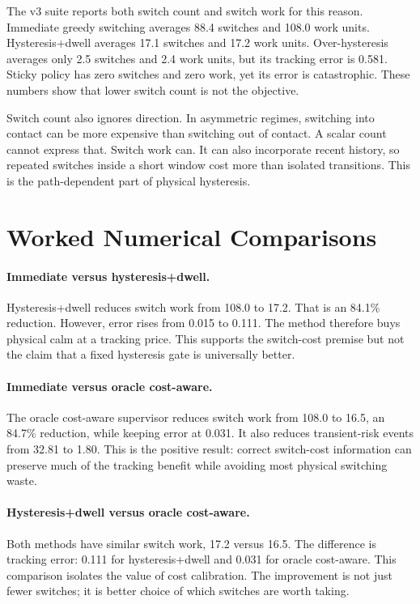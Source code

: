 \documentclass{article}
\begin{document}
The v3 suite reports both switch count and switch work for this reason.
Immediate greedy switching averages 88.4 switches and 108.0 work units.
Hysteresis+dwell averages 17.1 switches and 17.2 work units.
Over-hysteresis averages only 2.5 switches and 2.4 work units, but its tracking error is 0.581.
Sticky policy has zero switches and zero work, yet its error is catastrophic.
These numbers show that lower switch count is not the objective.

Switch count also ignores direction.
In asymmetric regimes, switching into contact can be more expensive than switching out of contact.
A scalar count cannot express that.
Switch work can.
It can also incorporate recent history, so repeated switches inside a short window cost more than isolated transitions.
This is the path-dependent part of physical hysteresis.

\section{Worked Numerical Comparisons}

\paragraph{Immediate versus hysteresis+dwell.}
Hysteresis+dwell reduces switch work from 108.0 to 17.2.
That is an 84.1\% reduction.
However, error rises from 0.015 to 0.111.
The method therefore buys physical calm at a tracking price.
This supports the switch-cost premise but not the claim that a fixed hysteresis gate is universally better.

\paragraph{Immediate versus oracle cost-aware.}
The oracle cost-aware supervisor reduces switch work from 108.0 to 16.5, an 84.7\% reduction, while keeping error at 0.031.
It also reduces transient-risk events from 32.81 to 1.80.
This is the positive result: correct switch-cost information can preserve much of the tracking benefit while avoiding most physical switching waste.

\paragraph{Hysteresis+dwell versus oracle cost-aware.}
Both methods have similar switch work, 17.2 versus 16.5.
The difference is tracking error: 0.111 for hysteresis+dwell and 0.031 for oracle cost-aware.
This comparison isolates the value of cost calibration.
The improvement is not just fewer switches; it is better choice of which switches are worth taking.
\end{document}

